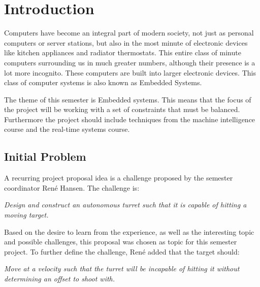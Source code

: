 \chapter{Introduction}
Computers have become an integral part of modern society, not just as personal
computers or server stations, but also in the most minute of electronic devices
like kitchen appliances and radiator thermostats. This entire class of minute
computers surrounding us in much greater numbers, although their presence is a
lot more incognito. These computers are built into larger electronic devices.
This class of computer systems is also known as Embedded Systems.\nl

The theme of this semester is Embedded systems. This means that the focus of
the project will be working with a set of constraints that must be balanced.
Furthermore the project should include techniques from the machine intelligence
course and the real-time systems course.


\section{Initial Problem}
A recurring project proposal idea is a challenge proposed by the semester coordinator Ren\'e
Hansen. The challenge is:

\begin{center}
\begin{minipage}{0.8\linewidth}
\textit{Design and construct an autonomous turret such that it is capable of
hitting a moving target.}
\end{minipage}
\end{center}

Based on the desire to learn from the experience, as well as the interesting
topic and possible challenges, this proposal was chosen as topic for this
semester project. To further define the challenge, Ren\'e added that the target
should:
\begin{center}
\begin{minipage}{0.8\linewidth}
\textit{Move at a velocity such that the turret will be incapable
of hitting it without determining an offset to shoot with.}
\end{minipage}
\end{center}

